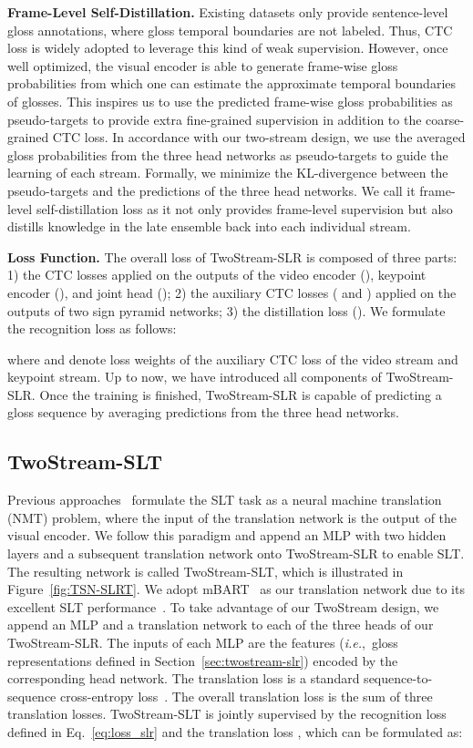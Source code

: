 \documentclass{article}
\def\ie{\emph{i.e.}} \def\Ie{\emph{I.e.}}
\begin{document}
\textbf{Frame-Level Self-Distillation.}
Existing datasets only provide sentence-level gloss annotations, where gloss temporal boundaries are not labeled. Thus, CTC~\cite{graves2006connectionist} loss is widely adopted to leverage this kind of weak supervision. However, once well optimized, the visual encoder is able to generate frame-wise gloss probabilities from which one can estimate the approximate temporal boundaries of glosses. This inspires us to use the predicted frame-wise gloss probabilities as pseudo-targets to provide extra fine-grained supervision in addition to the coarse-grained CTC loss. In accordance with our two-stream design, we use the averaged gloss probabilities from the three head networks as pseudo-targets to guide the learning of each stream. Formally, we minimize the KL-divergence between the pseudo-targets and the predictions of the three head networks. We call it frame-level self-distillation loss  as it not only provides frame-level supervision but also distills knowledge in the late ensemble back into each individual stream.



\textbf{Loss Function.}
The overall loss of TwoStream-SLR is composed of three parts: 1) the CTC losses applied on the outputs of the video encoder (), keypoint encoder (), and joint head (); 2) the auxiliary CTC losses ( and ) applied on the outputs of two sign pyramid networks; 3) the distillation loss (). We formulate the recognition loss as follows:

where  and  denote loss weights of the auxiliary CTC loss of the video stream and keypoint stream. Up to now, we have introduced all components of TwoStream-SLR. Once the training is finished, TwoStream-SLR is capable of predicting a gloss sequence by averaging predictions from the three head networks.

\subsection{TwoStream-SLT}
\label{sec:twostream-slt}
Previous approaches~\cite{camgoz2018neural, camgoz2020sign, li2020tspnet, STMC_MM, zhou2021improving,MMTLB_2022} formulate the SLT task as a neural machine translation (NMT) problem, where the input of the translation network is the output of the visual encoder. We follow this paradigm and append an MLP with two hidden layers and a subsequent translation network onto TwoStream-SLR to enable SLT. The resulting network is called TwoStream-SLT, which is illustrated in Figure~\ref{fig:TSN-SLRT}. We adopt mBART~\cite{liu2020multilingual} as our translation network due to its excellent SLT performance~\cite{MMTLB_2022}. To take advantage of our TwoStream design, we append an MLP and a translation network to each of the three heads of our TwoStream-SLR. The inputs of each MLP are the features (\ie,~gloss representations defined in Section~\ref{sec:twostream-slr}) encoded by the corresponding head network. The translation loss is a standard sequence-to-sequence cross-entropy loss~\cite{vaswani2017attention}. The overall translation loss  is the sum of three translation losses. TwoStream-SLT is jointly supervised by the recognition loss  defined in Eq.~\ref{eq:loss_slr} and the translation loss , which can be formulated as:
 
\end{document}
